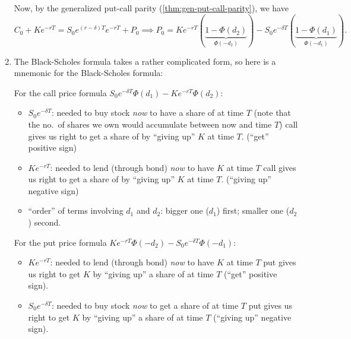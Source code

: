 \begin{enumerate}
\begin{pf}
Now, by the generalized put-call parity (\cref{thm:gen-put-call-parity}), we have
\[
C_0+Ke^{-rT}=S_0e^{(r-\delta)T}e^{-rT}+P_0
\implies
P_0=Ke^{-rT}(\underbrace{1-\Phi(d_2)}_{\Phi(-d_2)})-S_0e^{-\delta T}(\underbrace{1-\Phi(d_1)}_{\Phi(-d_1)}).
\]
\end{pf}

\item The Black-Scholes formula takes a rather complicated form, so here is a
mnemonic  for the Black-Scholes formula:

For the call price formula \(S_0e^{-\delta T}\Phi(d_1)-Ke^{-rT}\Phi(d_2)\):
\begin{itemize}
\item \(S_0e^{-\delta T}\):  needed to buy stock
 \emph{now} to have {\color{violet}a share of  at time
\(T\)} (note that the no.\ of shares we own would accumulate between now and
time \(T\))  call gives us right to {\color{violet}get a
share of } by ``giving up'' \(K\) at time \(T\).
({\color{violet}``get''}  positive sign)

\item \(Ke^{-rT}\):  needed to lend (through bond)
\emph{now} to have {\color{violet}\(K\) at time \(T\)}  call gives us right
to get a share of  by {\color{violet}``giving
up'' \(K\) at time \(T\)}. ({\color{violet}``giving up''}  negative sign)

\item ``order'' of terms involving \(d_1\) and \(d_2\): bigger one (\(d_1\))
first; smaller one (\(d_2\)) second.
\end{itemize}

For the put price formula \(Ke^{-rT}\Phi(-d_2)-S_0e^{-\delta T}\Phi(-d_1)\):
\begin{itemize}
\item \(Ke^{-rT}\):  needed to lend (through bond)
\emph{now} to have {\color{violet}\(K\) at time \(T\)} 
put gives us right to {\color{violet}get \(K\)} by ``giving up'' a share of
 at time \(T\) ({\color{violet}``get''} 
positive sign).

\item \(S_0e^{-\delta T}\):  needed to buy stock
 \emph{now} to get {\color{violet}a share of
 at time \(T\)}  put gives us right to
get \(K\) by {\color{violet}``giving up'' a share of  at
time \(T\)} ({\color{violet}``giving up''}  negative sign).


\end{itemize}
\end{enumerate}
